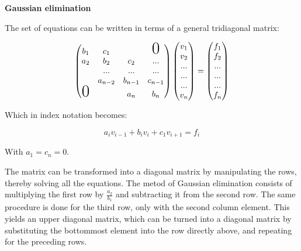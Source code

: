 \documentclass[11pt]{article}
\begin{document}
\begin{flushleft}
\textbf{Gaussian elimination}

The set of equations can be written in terms of a general tridiagonal matrix:

$$
\begin{pmatrix}
b_1 & c_1 &  & \text{\huge0}\\
a_2 & b_2 & c_2 &... \\
& ... & ... & ...\\
&   a_{n-2} & b_{n-1} & c_{n-1}\\
\text{\huge0}&  & a_n & b_n\\ 
\end{pmatrix}
\begin{pmatrix}
v_1\\
v_2\\
...\\
...\\
...\\
v_n\\
\end{pmatrix}
=
\begin{pmatrix}
f_1\\
f_2\\
...\\
...\\
...\\
f_n\\
\end{pmatrix}
$$

Which in index notation becomes:

\begin{equation}
a_i v_{i-1} + b_i v_i + c_1 v_{i+1} =f_i
\end{equation}

With $a_1= c_n = 0$. 
\end{flushleft}

\begin{flushleft}
The matrix can be transformed into a diagonal matrix by manipulating the rows, thereby solving all the equations. The metod of Gaussian elimination consists of multiplying the first row by $\frac{a_2}{b_1}$ and subtracting it from the second row. The same procedure is done for the third row, only with the second column element. This yields an upper diagonal matrix, which can be turned into a diagonal matrix by substituting the bottommost element into the row directly above, and repeating for the preceding rows.
\end{flushleft}
\end{document}
